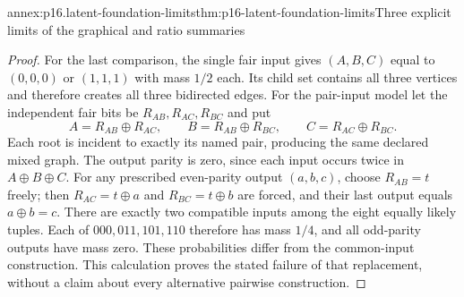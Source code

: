 \begin{annexitem}{annex:p16.latent-foundation-limits}{thm:p16-latent-foundation-limits}{Three explicit limits of the graphical and ratio summaries}
\begin{proof}
For the last comparison, the single fair input gives \((A,B,C)\)
equal to \((0,0,0)\) or \((1,1,1)\) with mass \(1/2\)
each. Its child set contains all three vertices and therefore
creates all three bidirected edges. For the pair-input model let
the independent fair bits be \(R_{AB},R_{AC},R_{BC}\) and put
\[
 A=R_{AB}\oplus R_{AC},\qquad
 B=R_{AB}\oplus R_{BC},\qquad
 C=R_{AC}\oplus R_{BC}.
\]
Each root is incident to exactly its named pair, producing the
same declared mixed graph. The output parity is zero, since each
input occurs twice in \(A\oplus B\oplus C\). For any prescribed
even-parity output \((a,b,c)\), choose \(R_{AB}=t\) freely;
then \(R_{AC}=t\oplus a\) and \(R_{BC}=t\oplus b\)
are forced, and their last output equals \(a\oplus b=c\).
There are exactly two compatible inputs among the eight equally
likely tuples. Each of \(000,011,101,110\) therefore has mass
\(1/4\), and all odd-parity outputs have mass zero. These
probabilities differ from the common-input construction. This
calculation proves the stated failure of that replacement, without
a claim about every alternative pairwise construction.
\end{proof}
\end{annexitem}
